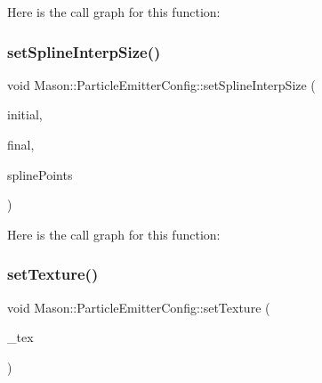 Here is the call graph for this function\+:
\hypertarget{struct_mason_1_1_particle_emitter_config_a4288325ce9dcf3437fbcabaf99f968b4}{}\label{struct_mason_1_1_particle_emitter_config_a4288325ce9dcf3437fbcabaf99f968b4} 
\subsubsection{\texorpdfstring{set\+Spline\+Interp\+Size()}{setSplineInterpSize()}}
{\footnotesize\ttfamily void Mason\+::\+Particle\+Emitter\+Config\+::set\+Spline\+Interp\+Size (\begin{DoxyParamCaption}\item[{float}]{initial,  }\item[{float}]{final,  }\item[{std\+::vector$<$ glm\+::vec2 $>$}]{spline\+Points }\end{DoxyParamCaption})\hspace{0.3cm}{\ttfamily [inline]}}

Here is the call graph for this function\+:
\hypertarget{struct_mason_1_1_particle_emitter_config_a92978f0e01ba1078889a3f288ff0c02b}{}\label{struct_mason_1_1_particle_emitter_config_a92978f0e01ba1078889a3f288ff0c02b} 
\subsubsection{\texorpdfstring{set\+Texture()}{setTexture()}}
{\footnotesize\ttfamily void Mason\+::\+Particle\+Emitter\+Config\+::set\+Texture (\begin{DoxyParamCaption}\item[{S\+R\+E\+::\+Texture $\ast$}]{\+\_\+tex }\end{DoxyParamCaption})\hspace{0.3cm}{\ttfamily [inline]}}

\hypertarget{struct_mason_1_1_particle_emitter_config_ae5eafd4808934831fb271304c24b6af7}{}\label{struct_mason_1_1_particle_emitter_config_ae5eafd4808934831fb271304c24b6af7} 
